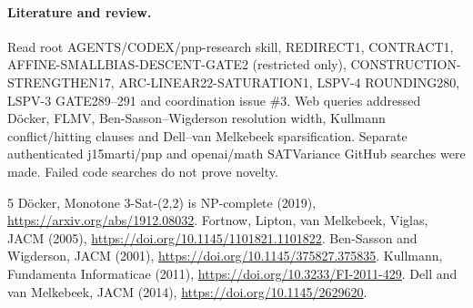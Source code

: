 \documentclass[11pt]{article}
\begin{document}
\paragraph{Literature and review.} Read root AGENTS/CODEX/pnp-research skill, REDIRECT1, CONTRACT1, AFFINE-SMALLBIAS-DESCENT-GATE2 (restricted only), CONSTRUCTION-STRENGTHEN17, ARC-LINEAR22-SATURATION1, LSPV-4 ROUNDING280, LSPV-3 GATE289--291 and coordination issue \#3. Web queries addressed D\"ocker, FLMV, Ben-Sasson--Wigderson resolution width, Kullmann conflict/hitting clauses and Dell--van Melkebeek sparsification. Separate authenticated j15marti/pnp and openai/math SATVariance GitHub searches were made. Failed code searches do not prove novelty.
\begin{thebibliography}{5}
 D\"ocker, Monotone 3-Sat-(2,2) is NP-complete (2019), \url{https://arxiv.org/abs/1912.08032}.
 Fortnow, Lipton, van Melkebeek, Viglas, JACM (2005), \url{https://doi.org/10.1145/1101821.1101822}.
 Ben-Sasson and Wigderson, JACM (2001), \url{https://doi.org/10.1145/375827.375835}.
 Kullmann, Fundamenta Informaticae (2011), \url{https://doi.org/10.3233/FI-2011-429}.
 Dell and van Melkebeek, JACM (2014), \url{https://doi.org/10.1145/2629620}.
\end{thebibliography}
\end{document}
